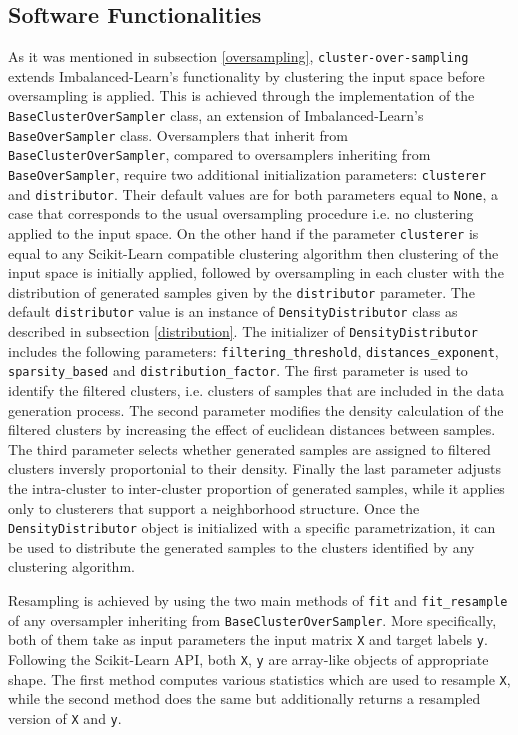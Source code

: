 \documentclass[preprint,12pt, a4paper]{elsarticle}
\begin{document}
\subsection{Software Functionalities}
\label{functionality}

As it was mentioned in subsection \ref{oversampling}, \texttt{cluster-over-sampling} extends Imbalanced-Learn's functionality by clustering the input space before oversampling is applied. This is achieved through the implementation of the \texttt{BaseClusterOverSampler} class, an extension of Imbalanced-Learn's \texttt{BaseOverSampler} class. Oversamplers that inherit from \texttt{BaseClusterOverSampler}, compared to oversamplers inheriting from \texttt{BaseOverSampler}, require two additional initialization parameters: \texttt{clusterer} and \texttt{distributor}. Their default values are for both parameters equal to \texttt{None}, a case that corresponds to the usual oversampling procedure i.e. no clustering applied to the input space. On the other hand if the parameter \texttt{clusterer} is equal to any Scikit-Learn compatible clustering algorithm then clustering of the input space is initially applied, followed by oversampling in each cluster with the distribution of generated samples given by the \texttt{distributor} parameter. The default \texttt{distributor} value is an instance of \texttt{DensityDistributor} class as described in subsection \ref{distribution}. The initializer of \texttt{DensityDistributor} includes the following parameters: \texttt{filtering\_threshold}, \texttt{distances\_exponent}, \texttt{sparsity\_based} and \texttt{distribution\_factor}. The first parameter is used to identify the filtered clusters, i.e. clusters of samples that are included in the data generation process. The second parameter modifies the density calculation of the filtered clusters by increasing the effect of euclidean distances between samples. The third parameter selects whether generated samples are assigned to filtered clusters inversly proportonial to their density. Finally the last parameter adjusts the intra-cluster to inter-cluster proportion of generated samples, while it applies only to clusterers that support a neighborhood structure. Once the \texttt{DensityDistributor} object is initialized with a specific parametrization, it can be used to distribute the generated samples to the clusters identified by any clustering algorithm.

Resampling is achieved by using the two main methods of \texttt{fit} and \texttt{fit\_resample} of any oversampler inheriting from \texttt{BaseClusterOverSampler}. More specifically, both of them take as input parameters the input matrix \texttt{X} and target labels \texttt{y}. Following the Scikit-Learn API, both \texttt{X}, \texttt{y} are array-like objects of appropriate shape. The first method computes various statistics which are used to resample \texttt{X}, while the second method does the same but additionally returns a resampled version of \texttt{X} and \texttt{y}.
\end{document}
